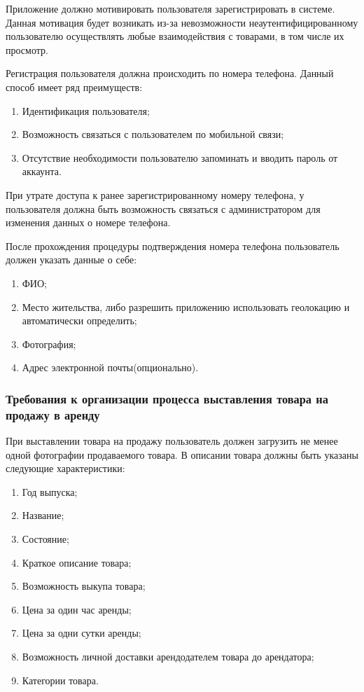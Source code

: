 Приложение должно мотивировать пользователя зарегистрировать в системе.
Данная мотивация будет возникать из-за невозможности неаутентифицированному пользователю осуществлять любые взаимодействия с товарами, в том числе их просмотр.

Регистрация пользователя должна происходить по номера телефона. Данный способ имеет ряд преимуществ:
\begin{enumerate}
    \item Идентификация пользователя;
    \item Возможность связаться с пользователем по мобильной связи;
    \item Отсутствие необходимости пользователю запоминать и вводить пароль от аккаунта.
\end{enumerate}

При утрате доступа к ранее зарегистрированному номеру телефона, у пользователя должна быть возможность связаться с администратором для изменения данных о номере телефона.

После прохождения процедуры подтверждения номера телефона пользователь должен указать данные о себе:
\begin{enumerate}
    \item ФИО;
    \item Место жительства, либо разрешить приложению использовать геолокацию и автоматически определить;
    \item Фотография;
    \item Адрес электронной почты(опционально).
\end{enumerate}

\subsubsection{Требования к организации процесса выставления товара на продажу в аренду}\hfill

При выставлении товара на продажу пользователь должен загрузить не менее одной фотографии продаваемого товара.
В описании товара должны быть указаны следующие характеристики:
\begin{enumerate}
    \item Год выпуска;
    \item Название;
    \item Состояние;
    \item Краткое описание товара;
    \item Возможность выкупа товара;
    \item Цена за один час аренды;
    \item Цена за одни сутки аренды;
    \item Возможность личной доставки арендодателем товара до арендатора;
    \item Категории товара.
\end{enumerate}

